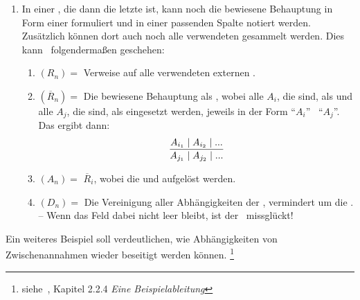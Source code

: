 {\begin{enumerate}
	Nun kann die Zeile beendet werden, oder es geht weiter mit:
	\begin{enumerate}
		\setcounter{enumii}{\value{Enumii}}%
		\item \label{item:Anwendung} $Z_n =$ Die Indizes aller $A_j$ (mit $j < i$), die eine  der  $\overline{R}_i$ sind, möglichst in der verwendeten Reihenfolge.
		-- Für jedes angegebene $j$ werden noch die Abhängigkeiten $D_j$ den Abhängigkeiten $D_i$ hinzugefügt.
		\item $A_i =$ (en) der  $\overline{R}_i$.
		-- Wenn diese  schon als  $A_j$ (mit $j < i$) vorhanden sind, können auch einfach deren Indizes eingetragen werden.
		Damit werden die Zusammenhänge und der Abschluss des \Beweises\ besser ersichtlich.
		\item $D_i =$ Die Verweise wurden schon in (\ref{item:Anwendung}) eingetragen.%
		\footnote{Wenn $D_n$ leer ist, dann ist $A_n$ allgemeingültig.}
	\end{enumerate}
	Der \Beweis\ muss so lange fortgeführt werden, bis alle  als  in der Spalte $(A_n)$ erschienen und dort jeweils nur von den gegebenen  abhängig sind.
	\item \label{item:Ergebniszeile} In einer , die dann die letzte ist, kann noch die bewiesene Behauptung in Form einer  formuliert und in einer passenden Spalte notiert werden.
	Zusätzlich können dort auch noch alle verwendeten  gesammelt werden.
	Dies kann \textzB\ folgendermaßen geschehen:
	\begin{enumerate}
		\item $(R_n) =$ Verweise auf alle verwendeten externen .
		\item $(\overline{R}_n) =$ Die bewiesene Behauptung als , wobei alle $A_i$, die  sind, als  und alle $A_j$, die  sind, als  eingesetzt werden, jeweils in der Form \enquote{$A_i$} \textbzgl\ \enquote{$A_j$}.
		Das ergibt dann:
		\[ \frac{A_{i_1} \mid A_{i_2} \mid ...}{A_{j_1} \mid A_{j_2} \mid ...} \]
		\item $(A_n) =$ $\overline{R}_i$, wobei die  und  aufgelöst werden.
		\item $(D_n) =$ Die Vereinigung aller Abhängigkeiten der , vermindert um die .
		-- Wenn das Feld dabei nicht leer bleibt, ist der \Beweis\ missglückt!
	\end{enumerate}
\end{enumerate}
%
Ein weiteres Beispiel  soll verdeutlichen, wie Abhängigkeiten von Zwischenannahmen wieder beseitigt werden können.%
\footnote{siehe~\cite{bib:NatuerlichesSchliessen},
Kapitel 2.2.4 \emph{Eine Beispielableitung}}

}
